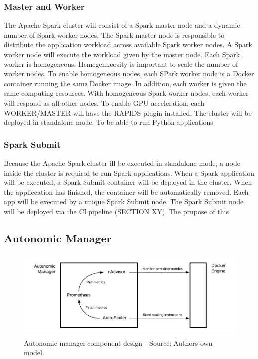 \subsubsection{Master and Worker}
The Apache Spark cluster will consist of a Spark master node and a dynamic number of Spark worker nodes.
The Spark master node is responsible to distribute the application workload across available Spark worker nodes.
A Spark worker node will execute the workload given by the master node. Each Spark worker is homogeneous. 
Homegenneosity is important to scale the number of worker nodes. To enable homogeneous nodes, each SPark worker node is a Docker container running the same Docker image. In addition, each worker is given the same computing resources. With homogeneous Spark worker nodes, each worker will respond as all other nodes.
To enable GPU acceleration, each WORKER/MASTER will have the RAPIDS plugin installed.
The cluster will be deployed in standalone mode. To be able to run Python applications


\subsubsection{Spark Submit}
Because the Apache Spark cluster ill be executed in standalone mode, a node inside the cluster is required to run Spark applications. When a Spark application will be executed, a Spark Submit container will be deployed in the cluster. When the appliccation has finished, the container will be automatically removed.
Each app will be executed by a unique Spark Submit node.
The Spark Submit node will be deployed via the CI pipeline (SECTION XY). The prupose of this 


\subsection{Autonomic Manager}
\label{subsec:05_arch_am}

\begin{figure}[h]
\centering
\includegraphics[scale=0.85]{images/05_conceptual_design/autonomic_manager/autonomic_manager_overview}
\caption{Autonomic manager component design - Source: Authors own model.}
\label{fig:am-design-component}
\end{figure}

